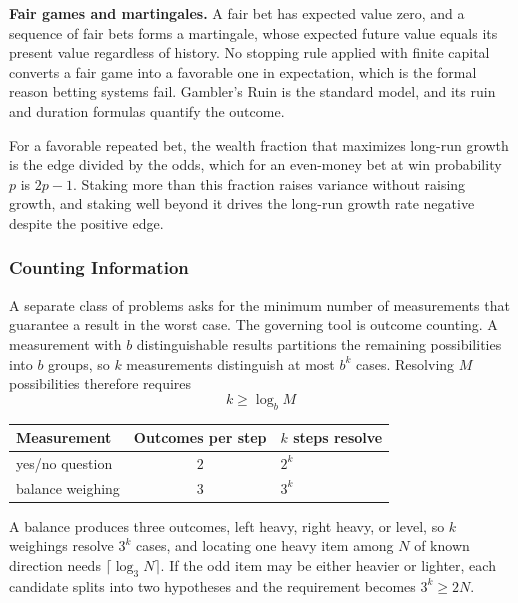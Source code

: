 \textbf{Fair games and martingales.} A fair bet has expected value zero, and a sequence of fair bets forms a martingale, whose expected future value equals its present value regardless of history. No stopping rule applied with finite capital converts a fair game into a favorable one in expectation, which is the formal reason betting systems fail. Gambler's Ruin is the standard model, and its ruin and duration formulas quantify the outcome.

\begin{remark}
For a favorable repeated bet, the wealth fraction that maximizes long-run growth is the edge divided by the odds, which for an even-money bet at win probability $p$ is $2p - 1$. Staking more than this fraction raises variance without raising growth, and staking well beyond it drives the long-run growth rate negative despite the positive edge.
\end{remark}

\subsubsection{Counting Information}

A separate class of problems asks for the minimum number of measurements that guarantee a result in the worst case. The governing tool is outcome counting. A measurement with $b$ distinguishable results partitions the remaining possibilities into $b$ groups, so $k$ measurements distinguish at most $b^k$ cases. Resolving $M$ possibilities therefore requires
\[
k \geq \log_b M
\]

\begin{keybox}
\begin{center}
\begin{tabular}{@{}lcl@{}}
\toprule
\textbf{Measurement} & \textbf{Outcomes per step} & \textbf{$k$ steps resolve} \\
\midrule
yes/no question & $2$ & $2^k$ \\
balance weighing & $3$ & $3^k$ \\
\bottomrule
\end{tabular}
\end{center}

\vspace{2ex}

A balance produces three outcomes, left heavy, right heavy, or level, so $k$ weighings resolve $3^k$ cases, and locating one heavy item among $N$ of known direction needs $\lceil \log_3 N \rceil$. If the odd item may be either heavier or lighter, each candidate splits into two hypotheses and the requirement becomes $3^k \geq 2N$.
\end{keybox}

